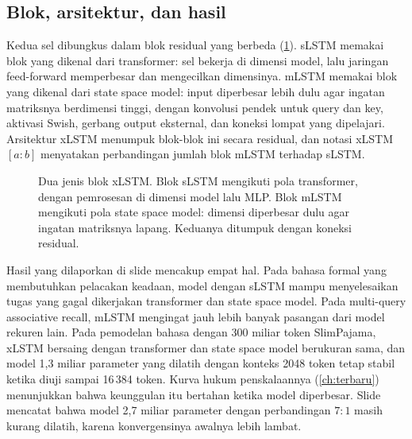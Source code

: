 \subsection{Blok, arsitektur, dan hasil}

Kedua sel dibungkus dalam blok residual yang berbeda (\cref{fig:xlstm}). sLSTM memakai blok 
yang dikenal dari transformer: sel bekerja di dimensi model, lalu jaringan feed-forward memperbesar dan mengecilkan
dimensinya. mLSTM memakai blok  yang dikenal dari state space model: input diperbesar lebih
dulu agar ingatan matriksnya berdimensi tinggi, dengan konvolusi pendek untuk query dan key, aktivasi Swish, gerbang
output eksternal, dan koneksi lompat yang dipelajari. Arsitektur xLSTM menumpuk blok-blok ini secara residual, dan
notasi xLSTM$[a{:}b]$ menyatakan perbandingan jumlah blok mLSTM terhadap sLSTM.

\begin{figure}[ht]
\centering
{}
\caption{Dua jenis blok xLSTM. Blok sLSTM mengikuti pola transformer, dengan pemrosesan di dimensi model lalu MLP. Blok
mLSTM mengikuti pola state space model: dimensi diperbesar dulu agar ingatan matriksnya lapang. Keduanya ditumpuk
dengan koneksi residual.}
\label{fig:xlstm}
\end{figure}

Hasil yang dilaporkan di slide mencakup empat hal. Pada bahasa formal yang membutuhkan pelacakan keadaan, model dengan
sLSTM mampu menyelesaikan tugas yang gagal dikerjakan transformer dan state space model. Pada multi-query associative
recall, mLSTM mengingat jauh lebih banyak pasangan dari model rekuren lain. Pada pemodelan bahasa dengan 300 miliar token
SlimPajama, xLSTM bersaing dengan transformer dan state space model berukuran sama, dan model 1,3 miliar parameter yang
dilatih dengan konteks 2048 token tetap stabil ketika diuji sampai 16\,384 token. Kurva hukum penskalaannya
(\cref{ch:terbaru}) menunjukkan bahwa keunggulan itu bertahan ketika model diperbesar. Slide mencatat bahwa model 2,7 miliar
parameter dengan perbandingan $7{:}1$ masih kurang dilatih, karena konvergensinya awalnya lebih lambat.

